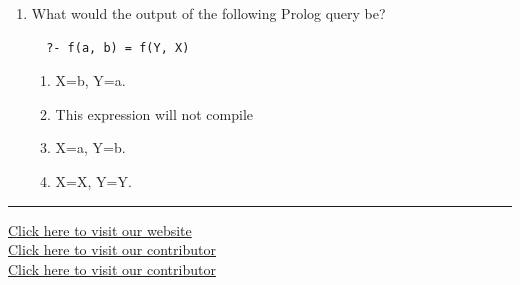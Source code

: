 \documentclass[11pt,a4paper]{article}
\begin{document}
\begin{enumerate}[label=(\roman*),leftmargin=*,itemsep=12pt]
  \item What would the output of the following Prolog query be?
  
\begin{verbatim}
  ?- f(a, b) = f(Y, X)
  \end{verbatim}
  
\begin{enumerate}[label=(\alph*),itemsep=2pt]
    \item X=b, Y=a.
    \item This expression will not compile
    \item X=a, Y=b.
    \item X=X, Y=Y.
  \end{enumerate}
\end{enumerate}

\vfill
\rule{\linewidth}{0.4pt}

\begin{center}\small
\href{https://bhu-exam.vercel.app/}{Click here to visit our website}\\[4pt]\href{https://me-aryan.vercel.app/}{Click here to visit our contributor}\\[4pt]\href{https://quashan-me.vercel.app/}{Click here to visit our contributor}
\end{center}
\end{document}
